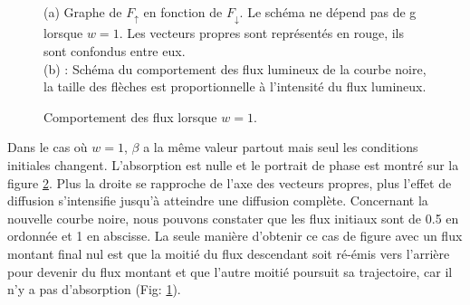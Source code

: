 \documentclass[12pt]{article}
\begin{document}
\begin{figure}[H]
\begin{subfigure}{0.305\textwidth}
        \captionsetup{width=1.2\textwidth}
        \caption{} 
        \label{fig:Sub_Schema_W=1}
    \end{subfigure}
    \caption{Comportement des flux lorsque $w=1$.}
    \justifying \noindent
    (a) Graphe de $F_{\uparrow}$ en fonction de $F_{\downarrow}$. Le schéma ne dépend pas de g lorsque $w=1$. Les vecteurs propres sont représentés en rouge, ils sont confondus entre eux. \\(b) : Schéma du comportement des flux lumineux de la courbe noire, la taille des flèches est proportionnelle à l'intensité du flux lumineux.
    \label{fig:W=1}
\end{figure} %
Dans le cas où $w=1$, $\beta$ a la même valeur partout mais seul les conditions initiales changent. L'absorption est nulle et le portrait de phase est montré sur la figure \ref{fig:W=1}.
Plus la droite se rapproche de l'axe des vecteurs propres, plus l'effet de diffusion s'intensifie jusqu'à atteindre une diffusion complète. 
Concernant la nouvelle courbe noire, nous pouvons constater que les flux initiaux sont de 0.5 en ordonnée et 1 en abscisse.
La seule manière d'obtenir ce cas de figure avec un flux montant final nul est que la moitié du flux descendant soit ré-émis vers l'arrière pour devenir du flux montant et que
l'autre moitié poursuit sa trajectoire, car il n'y a pas d'absorption (Fig: \ref{fig:Sub_Schema_W=1}).
\end{document}
